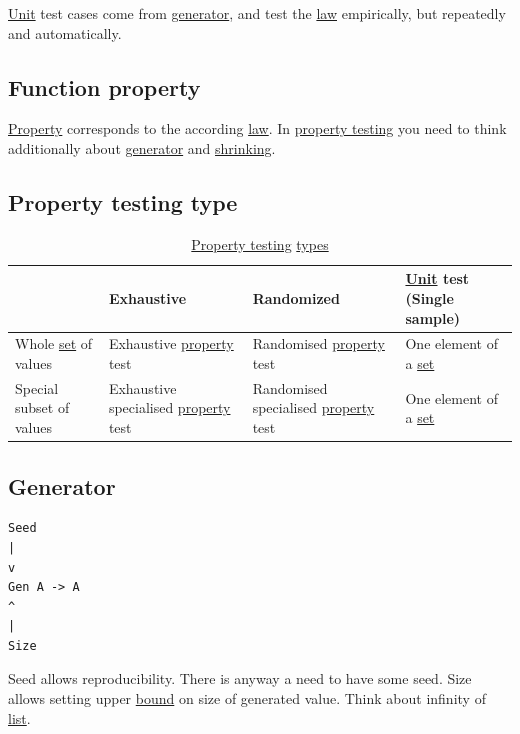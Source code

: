 \documentclass[a4paper,14pt,oneside]{book}
\begin{document}
\hyperref[orga626f14]{Unit} test cases come from \hyperref[org533814d]{generator}, and test the \hyperref[org150d912]{law} empirically, but repeatedly and automatically.

\subsection{\label{org829e78d}Function property}
\label{sec:orgd4d0272}

\hyperref[orgb6e81ca]{Property} corresponds to the according \hyperref[org150d912]{law}.
In \hyperref[org97132f1]{property testing} you need to think additionally about \hyperref[org533814d]{generator} and \hyperref[org7bea686]{shrinking}.

\subsection{\label{org8d8e99d}Property testing type}
\label{sec:org668dc70}

\begin{table}[htbp]
\caption{\label{tab--property-testing-type}\hyperref[org97132f1]{Property testing} \hyperref[org94fb39c]{types}}
\centering
\begin{tabu} spread \linewidth {llll}
\toprule
 & Exhaustive & Randomized & \hyperref[orga626f14]{Unit} test (Single sample)\\
\midrule
Whole \hyperref[org1f3ff57]{set} of values & Exhaustive \hyperref[orgb6e81ca]{property} test & Randomised \hyperref[orgb6e81ca]{property} test & One element of a \hyperref[org1f3ff57]{set}\\
Special subset of values & Exhaustive specialised \hyperref[orgb6e81ca]{property} test & Randomised specialised \hyperref[orgb6e81ca]{property} test & One element of a \hyperref[org1f3ff57]{set}\\
\bottomrule
\end{tabu}
\end{table}

\subsection{\label{org533814d}Generator}
\label{sec:org2006ab0}
\begin{verbatim}
Seed
|
v
Gen A -> A
^
|
Size
\end{verbatim}

Seed allows reproducibility.
There is anyway a need to have some seed.
Size allows setting upper \hyperref[org5f85414]{bound} on size of generated value. Think about infinity of \hyperref[org3595c2b]{list}.
\end{document}
